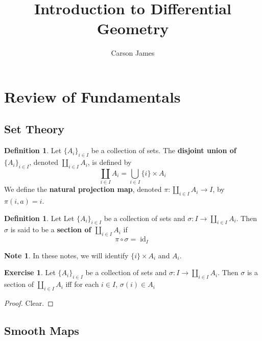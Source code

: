\documentclass[12pt]{amsart}
\theoremstyle{definition}
\newtheorem{defn}[definition]{Definition}
\newtheorem{note}[definition]{Note}
\newtheorem{ex}[definition]{Exercise}
\newcommand{\sig}{\sigma}
\DeclareMathOperator{\id}{id}
\begin{document}
	
	\title{Introduction to Differential Geometry}
	\author{Carson James}
	\maketitle
	
	\tableofcontents
	
	\section{Review of Fundamentals}

	\subsection{Set Theory}
	
	\begin{defn}
		Let $\{A_i\}_{i \in I}$ be a collection of sets. The \textbf{disjoint union of} $\{A_i\}_{i \in I}$, denoted $\coprod\limits_{i \in I} A_i$, is defined by $$\coprod_{i \in I}A_i = \bigcup_{i\in I} \{i\} \times A_i$$ 
		We define the \textbf{natural projection map}, denoted $\pi: \coprod\limits_{i \in I} A_i \rightarrow I$, by $\pi(i, a) = i$.
	\end{defn}

	\begin{defn}
		Let Let $\{A_i\}_{i \in I}$ be a collection of sets and $\sig: I \rightarrow \coprod\limits_{i \in I} A_i$. Then $\sig$ is said to be a \textbf{section of $\coprod\limits_{i \in I} A_i$} if $$\pi \circ \sig = \id_I$$
	\end{defn}

	\begin{note}
		In these notes, we will identify $\{i\} \times A_i$ and $A_i$.
	\end{note}

	\begin{ex}
		Let $\{A_i\}_{i \in I}$ be a collection of sets and $\sig: I \rightarrow \coprod\limits_{i \in I} A_i$. Then $\sig$ is a section of $\coprod\limits_{i \in I} A_i$ iff for each $i \in I$, $\sig(i) \in A_i$
	\end{ex}
	
	\begin{proof}
		Clear.
	\end{proof}
	
	\subsection{Smooth Maps}
	
\end{document}
